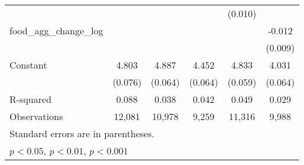 \begin{table}[htbp]
\begin{tabular}{l*{5}{c}}
                    &                     &                     &                     &     (0.010)         &                     \\
food\_agg\_change\_log &                     &                     &                     &                     &      -0.012         \\
                    &                     &                     &                     &                     &     (0.009)         \\
Constant            &       4.803\sym{***}&       4.887\sym{***}&       4.452\sym{***}&       4.833\sym{***}&       4.031\sym{***}\\
                    &     (0.076)         &     (0.064)         &     (0.064)         &     (0.059)         &     (0.064)         \\
\hline
R-squared           &       0.088         &       0.038         &       0.042         &       0.049         &       0.029         \\
Observations        &      12,081         &      10,978         &       9,259         &      11,316         &       9,988         \\
\hline\hline
\multicolumn{6}{l}{\footnotesize Standard errors are in parentheses.}\\
\multicolumn{6}{l}{\footnotesize \sym{*} \(p<0.05\), \sym{**} \(p<0.01\), \sym{***} \(p<0.001\)}\\
\end{tabular}
\end{table}
